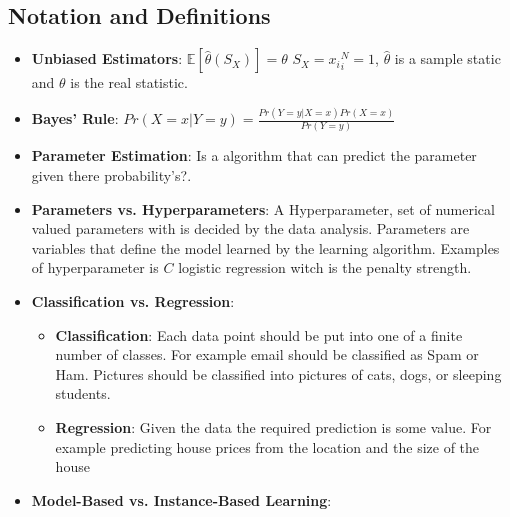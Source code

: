 

\subsection{Notation and Definitions}

\begin{itemize}
    \item \textbf{Unbiased Estimators}: \newline
    $\mathbb{E}[\hat{\theta}(S_X)] = \theta$ \newline
    $S_X={x_i}^N_i=1$, $\hat{\theta}$ is a sample static and $\theta$ is the real statistic.
    \item \textbf{Bayes' Rule}: \newline
    $Pr(X=x|Y=y)=\frac{Pr(Y=y|X=x)Pr(X=x)}{Pr(Y=y)}$
    \item \textbf{Parameter Estimation}: \newline
    Is a algorithm that can predict the parameter given there probability's?. 
    \item \textbf{Parameters vs. Hyperparameters}: \newline
    A Hyperparameter, set of numerical valued parameters with is decided by the data analysis.
    Parameters are variables that define the model learned by the learning algorithm. Examples of 
    hyperparameter is $C$ logistic regression witch is the penalty strength.
    \item \textbf{Classification vs. Regression}:
    \begin{itemize}
        \item \textbf{Classification}: Each data point should be put into one of a finite number of
        classes. For example email should be classified as Spam or
        Ham. Pictures should be classified into pictures of cats,
        dogs, or sleeping students. 
        \item \textbf{Regression}: Given the data the required prediction is some value. For
        example predicting house prices from the location and the
        size of the house
    \end{itemize}
    \item \textbf{Model-Based vs. Instance-Based Learning}: \newline

\end{itemize}
